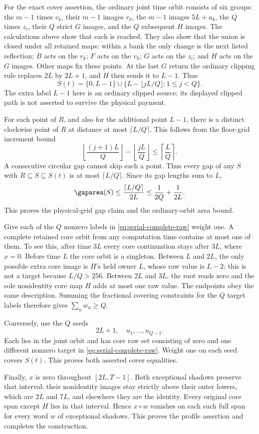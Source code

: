 \begin{outline}
For the exact cover assertion, the ordinary joint time orbit consists
of six groups: the $m-1$ times $v_k$, their $m-1$ images $r_k$, the
$m-1$ images $5L+a_k$, the $Q$ times $z_i$, their $Q$ strict $G$
images, and the $Q$ subsequent $H$ images.  The calculations above
show that each is reached.  They also show that the union is closed
under all retained maps: within a bank the only change is the next
listed reflection; $B$ acts on the $r_k$; $F$ acts on the $v_k$;
$G$ acts on the $z_i$; and $H$ acts on the $G$ images.  Other maps
fix these points.  At the last $G$ return the ordinary clipping rule
replaces $2L$ by $2L+1$, and $H$ then sends it to $L-1$.  Thus
\begin{equation}
 S(t)=\{0,L-1\}\cup
      \{L-\lfloor jL/Q\rfloor:1\le j<Q\}.
 \label{eq:serial-complete-raw}
\end{equation}
The extra label $L-1$ here is an ordinary clipped source; its displayed
clipped path is not asserted to survive the physical payment.

For each point of $R$, and also for the additional point $L-1$, there
is a distinct clockwise point of $R$ at distance at most
$\lceil L/Q\rceil$.  This follows from the floor-grid increment bound
\[
 \left\lfloor\frac{(j+1)L}{Q}\right\rfloor
 -\left\lfloor\frac{jL}{Q}\right\rfloor
 \le\left\lceil\frac LQ\right\rceil.
\]
A consecutive circular gap cannot skip such a point.  Thus every gap
of any $S$ with $R\subseteq S\subseteq S(t)$ is at most
$\lceil L/Q\rceil$.  Since its gap lengths sum to $L$,
\[
 \gaparea(S)\le\frac{\lceil L/Q\rceil}{2L}
       \le\frac1{2Q}+\frac1{2L}.
\]
This proves the physical-grid gap claim and the ordinary-orbit area bound.

Give each of the $Q$ nonzero labels in
\cref{eq:serial-complete-raw} weight one.  A complete retained core
orbit from any computation time contains at most one of them.  To see
this, after time $3L$ every core continuation stays after $3L$, where
$x=0$.  Before time $L$ the core orbit is a singleton.  Between $L$
and $2L$, the only possible extra core image is $H$'s held owner $L$,
whose raw value is $L-2$; this is not a target because $L/Q>256$.
Between $2L$ and $3L$, the root reads zero and the sole nonidentity
core map $H$ adds at most one raw value.  The endpoints obey the same
description.  Summing the fractional covering constraints for the
$Q$ target labels therefore gives
$\sum_u w_u\ge Q$.

Conversely, use the $Q$ seeds
\[
 2L+1,\quad u_1,\ldots,u_{Q-1}.
\]
Each lies in the joint orbit and has core raw set consisting of zero
and one different nonzero target in
\cref{eq:serial-complete-raw}.  Weight one on each seed covers $S(t)$.
This proves both asserted cover equalities.

Finally, $x$ is zero throughout $[2L,T-1]$.  Both exceptional shadows
preserve that interval: their nonidentity images stay strictly above
their outer lowers, which are $2L$ and $7L$, and elsewhere they are
the identity.  Every original core span except $H$ lies in that
interval.  Hence $x\circ w$ vanishes on each such full span for every
word $w$ of exceptional shadows.  This proves the profile assertion
and completes the construction.
\end{outline}

